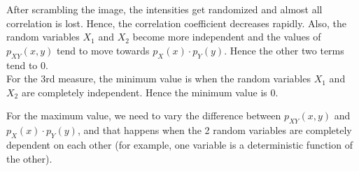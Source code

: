 \documentclass[11pt]{article}
\begin{document}
\begin{enumerate}
{		After scrambling the image, the intensities get randomized and almost all correlation is lost. Hence, the correlation coefficient decreases rapidly. Also, the random variables $X_1$ and $X_2$ become more independent and the values of $p_{XY}(x,y)$ tend to move towards $p_X(x)\cdot p_Y(y)$. Hence the other two terms tend to 0. \\

		For the 3rd measure, the minimum value is when the random variables $X_1$ and $X_2$ are completely independent. Hence the minimum value is 0.

		For the maximum value, we need to vary the difference between $p_{XY}(x,y)$ and $p_X(x)\cdot p_Y(y)$, and that happens when the 2 random variables are completely dependent on each other (for example, one variable is a deterministic function of the other). 
		}
\end{enumerate}
\end{document}

